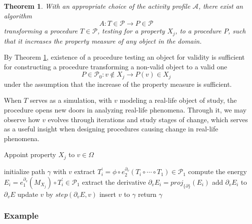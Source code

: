 \documentclass[smallcondensed]{svjour3}
\newcommand{\dP}{\mathcal{P}}
\newcommand{\D}{\partial}
\newtheorem{izrek}{Theorem}[section]
\begin{document}
      \begin{izrek}\label{izr:algA}
           With an appropriate choice of the activity profile $\mathcal{A}$, there exist an algorithm
           \begin{equation}\label{eq:algA}
             A:T\in\dP\to P\in\dP
             \end{equation}
             transforming a procedure $T\in\dP$, testing for a property $X_j$, to a procedure $P$, such that it increases the property measure of any object in the domain. 
           \end{izrek}
           \begin{corollary}
              By Theorem \ref{izr:algA}, existence of a procedure testing an object for validity is sufficient for constructing a procedure transforming a non-valid object to a valid one
              $$P\in \dP_0:v\notin X_j\to P(v)\in X_j$$
              under the assumption that the increase of the property measure is sufficient.
              \end{corollary}
              
    When $T$ serves as a simulation, with $v$ modeling a real-life object of study, the procedure opens new doors in analyzing real-life phenomena. Through it, we may observe how $v$ evolves through iterations and study stages of change, which serves as a useful insight when designing procedures causing change in real-life phenomena.          
   
   \begin{algorithm}[H]
   \caption{Appoint property $X_j$ to $v\in \Omega$}
   \label{alg:appoint}
   \begin{algorithmic}[1]
   \State initialize path $\gamma$ with $v$
   \State extract $T^\prime_i=\phi\circ e^{\D_{v}}_2(T_i\circ\cdots\circ T_1)\in\dP_1$
   \State compute the energy $E_i=e^{\D_v}_1(M_{X_j})\circ T^\prime_i\in\dP_1$
   \State extract the derivative $\D_v E_i=proj_{\{\D\}}(E_i)$
   \State add $\D_v E_i$ to $\D_v E$
   \EndFor
   \State update $v$ by $step(\D_v E,v)$
   \State insert $v$ to $\gamma$
   \EndFor
   \State return $\gamma$
   \EndProcedure
   \end{algorithmic}
   \end{algorithm}

   
   \subsubsection{Example}
   
\end{document}
